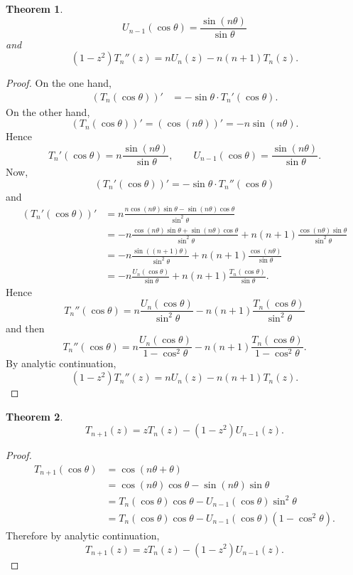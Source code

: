 \documentclass{article}
\newtheorem{theorem}{Theorem}
\theoremstyle{definition}
\begin{document}
\begin{theorem}
\[
U_{n-1}(\cos \theta) = \frac{\sin(n\theta)}{\sin \theta}
\]
and
\[
(1-z^2)T_n''(z) = n U_n(z) - n(n+1) T_n(z).
\]
\label{D2T}
\end{theorem}
\begin{proof}
On the one hand,
\begin{align*}
(T_n(\cos \theta))'&=-\sin\theta \cdot T_n'(\cos \theta).
\end{align*}
On the other hand,
\[
(T_n(\cos \theta))'
=(\cos (n\theta))'
=-n\sin(n\theta).
\]
Hence
\[
T_n'(\cos \theta) = n \frac{\sin (n\theta)}{\sin \theta},
\qquad U_{n-1}(\cos \theta) = \frac{\sin(n\theta)}{\sin \theta}.
\]
Now,
\[
(T_n'(\cos \theta))' =
-\sin \theta\cdot T_n''(\cos \theta)
\]
and
\begin{align*}
(T_n'(\cos \theta))' &= n \frac{n\cos(n\theta)\sin\theta - \sin(n\theta)\cos \theta}{\sin^2 \theta}\\
&=-n\frac{\cos(n\theta)\sin \theta+\sin(n\theta)\cos \theta}{\sin^2\theta}
+n(n+1) \frac{\cos(n\theta)\sin\theta}{\sin^2\theta}\\
&=-n\frac{\sin((n+1)\theta)}{\sin^2\theta}+n(n+1) \frac{\cos(n\theta)}{\sin\theta}\\
&=-n \frac{U_n(\cos \theta)}{\sin \theta} + n(n+1) \frac{T_n(\cos \theta)}{\sin \theta}.
\end{align*}
Hence
\[
T_n''(\cos \theta) = n \frac{U_n(\cos \theta)}{\sin^2 \theta} - n(n+1) \frac{T_n(\cos \theta)}{\sin^2 \theta}
\]
and then
\[
T_n''(\cos \theta) 
=n \frac{U_n(\cos \theta)}{1-\cos^2\theta} - n(n+1) \frac{T_n(\cos \theta)}{1-\cos^2\theta}.
\]
By analytic continuation,
\[
(1-z^2)T_n''(z) = n U_n(z) - n(n+1) T_n(z).
\]
\end{proof}

\begin{theorem}
\[
T_{n+1}(z) = z T_n(z) - (1-z^2)U_{n-1}(z).
\]
\label{Tnformula}
\end{theorem}
\begin{proof}
\begin{align*}
T_{n+1}(\cos \theta)&=\cos(n\theta+\theta)\\
&=\cos(n\theta)\cos\theta - \sin(n\theta)\sin\theta\\
&=T_n(\cos \theta) \cos \theta - U_{n-1}(\cos \theta)\sin^2\theta\\
&=T_n(\cos \theta) \cos \theta - U_{n-1}(\cos \theta)(1-\cos^2\theta).
\end{align*}
Therefore by analytic continuation,
\[
T_{n+1}(z) = z T_n(z) - (1-z^2)U_{n-1}(z).
\]
\end{proof}
\end{document}
